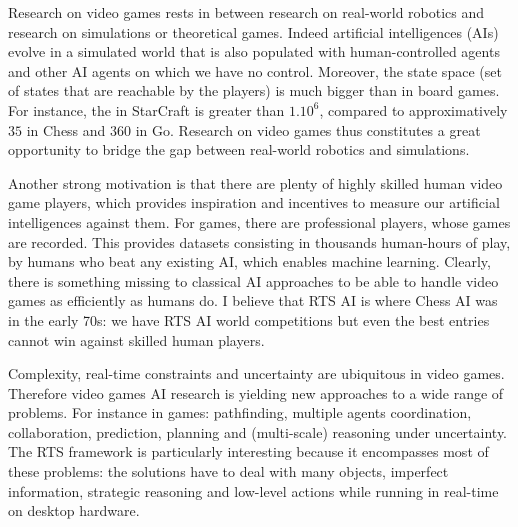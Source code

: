 Research on video games rests in between research on real-world robotics and research on simulations or theoretical games. Indeed artificial intelligences (AIs) evolve in a simulated world that is also populated with human-controlled agents and other AI agents on which we have no control. 
Moreover, the state space (set of states that are reachable by the players) is much bigger than in board games. For instance, the  in StarCraft is greater than $1.10^6$, compared to approximatively $35$ in Chess and $360$ in Go. 
Research on video games thus constitutes a great opportunity to bridge the gap between real-world robotics and simulations.


Another strong motivation is that there are plenty of highly skilled human video game players, which provides inspiration and incentives to measure our artificial intelligences against them. For  games, there are professional players, whose games are recorded. This provides datasets consisting in thousands human-hours of play, by humans who beat any existing AI, which enables machine learning. Clearly, there is something missing to classical AI approaches to be able to handle video games as efficiently as humans do. I believe that RTS AI is where Chess AI was in the early 70s: we have RTS AI world competitions but even the best entries cannot win against skilled human players.


Complexity, real-time constraints and uncertainty are ubiquitous in video games. Therefore video games AI research is yielding new approaches to a wide range of problems. For instance in  games: pathfinding, multiple agents coordination, collaboration, prediction, planning and (multi-scale) reasoning under uncertainty. The RTS framework is particularly interesting because it encompasses most of these problems: the solutions have to deal with many objects, imperfect information, strategic reasoning and low-level actions while running in real-time on desktop hardware.

